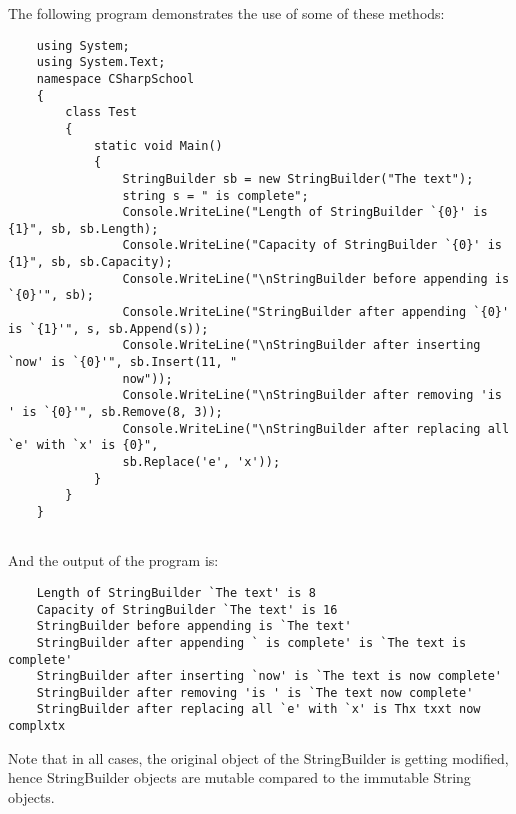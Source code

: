The following program demonstrates the use of some of these methods:

\begin{lstlisting}
    using System;
    using System.Text;
    namespace CSharpSchool
    {
        class Test
        {
            static void Main()
            {
                StringBuilder sb = new StringBuilder("The text");
                string s = " is complete";
                Console.WriteLine("Length of StringBuilder `{0}' is {1}", sb, sb.Length);
                Console.WriteLine("Capacity of StringBuilder `{0}' is {1}", sb, sb.Capacity);
                Console.WriteLine("\nStringBuilder before appending is `{0}'", sb);
                Console.WriteLine("StringBuilder after appending `{0}' is `{1}'", s, sb.Append(s));
                Console.WriteLine("\nStringBuilder after inserting `now' is `{0}'", sb.Insert(11, "
                now"));
                Console.WriteLine("\nStringBuilder after removing 'is ' is `{0}'", sb.Remove(8, 3));
                Console.WriteLine("\nStringBuilder after replacing all `e' with `x' is {0}",
                sb.Replace('e', 'x'));
            }
        }
    }
        
\end{lstlisting}


And the output of the program is:

\begin{lstlisting}
    Length of StringBuilder `The text' is 8
    Capacity of StringBuilder `The text' is 16
    StringBuilder before appending is `The text'
    StringBuilder after appending ` is complete' is `The text is complete'
    StringBuilder after inserting `now' is `The text is now complete'
    StringBuilder after removing 'is ' is `The text now complete'
    StringBuilder after replacing all `e' with `x' is Thx txxt now complxtx        
\end{lstlisting}

Note that in all cases, the original object of the StringBuilder is getting modified, hence StringBuilder objects are
mutable compared to the immutable String objects.
